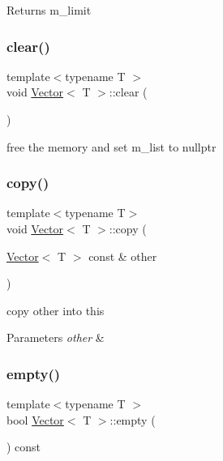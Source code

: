 \begin{DoxyReturn}{Returns}
m\+\_\+limit 
\end{DoxyReturn}
\mbox{\label{classVector_a32ad98b135472b0ebc5d6cb3ae5d0085}} 
\subsubsection{\texorpdfstring{clear()}{clear()}}
{\footnotesize\ttfamily template$<$typename T $>$ \\
void \hyperlink{classVector}{Vector}$<$ T $>$\+::clear (\begin{DoxyParamCaption}{ }\end{DoxyParamCaption})\hspace{0.3cm}{\ttfamily [private]}}



free the memory and set m\+\_\+list to nullptr 

\mbox{\label{classVector_a13238db900a2c169c9fea56118fb33dd}} 
\subsubsection{\texorpdfstring{copy()}{copy()}}
{\footnotesize\ttfamily template$<$typename T$>$ \\
void \hyperlink{classVector}{Vector}$<$ T $>$\+::copy (\begin{DoxyParamCaption}\item[{\hyperlink{classVector}{Vector}$<$ T $>$ const \&}]{other }\end{DoxyParamCaption})\hspace{0.3cm}{\ttfamily [private]}}

copy other into this 
\begin{DoxyParams}{Parameters}
{\em other} & \\
\hline
\end{DoxyParams}
\mbox{\label{classVector_ad688a8a0dfbd07ea63d838058a436f79}} 
\subsubsection{\texorpdfstring{empty()}{empty()}}
{\footnotesize\ttfamily template$<$typename T $>$ \\
bool \hyperlink{classVector}{Vector}$<$ T $>$\+::empty (\begin{DoxyParamCaption}{ }\end{DoxyParamCaption}) const}


